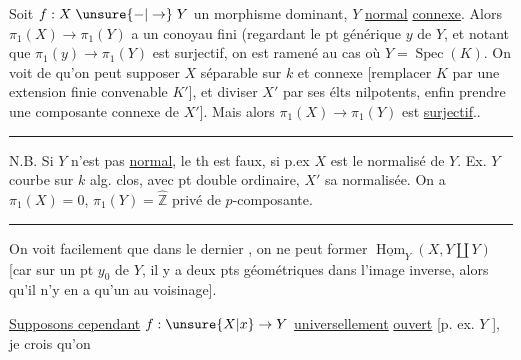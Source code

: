 Soit $f:X\mathrel{\unsure{-|\to}}Y$ un morphisme  dominant, $Y$  \uline{normal} \uline{connexe}.
Alors $\pi_1(X)\to\pi_1(Y)$ a un conoyau fini (regardant
le pt générique $y$ de $Y$, et notant que $\pi_1(y)\to\pi_1(Y)$ est
surjectif, on est ramené au cas où $Y=\operatorname{Spec}(K)$.
On voit de  qu'on peut supposer $X$ séparable sur $k$
et  connexe [remplacer $K$ par une extension 
finie convenable $K'$], et diviser  $X'$ par ses élts
nilpotents, enfin prendre une composante connexe
de $X'$]. Mais alors $\pi_1(X)\to\pi_1(Y)$ est \uline{surjectif}..

\noindent\rule{2em}{0.25pt}

N.B. Si $Y$ n'est pas \uline{normal}, le th est faux,
 si p.ex $X$ est le normalisé de $Y$. Ex. $Y$ courbe
 sur $k$ alg. clos, avec pt double ordinaire,
$X'$ sa normalisée. On a $\pi_1(X)=0$, $\pi_1(Y)=\widehat{\mathbb Z}$
privé de  $p$-composante.

\noindent\rule{2em}{0.25pt}

On voit facilement que dans le dernier
, on ne peut former $\underline{\operatorname{Hom}}_Y(X,Y\amalg Y)$
[car sur un  pt $y_0$ de $Y$, il y a deux pts
géométriques dans l'image inverse, alors
qu'il n'y en a qu'un au voisinage].

\uline{Supposons cependant} $f:\unsure{X|x}\to Y$ \uline{universellement}
\uline{ouvert} [p. ex. $Y$ ], je crois qu'on
